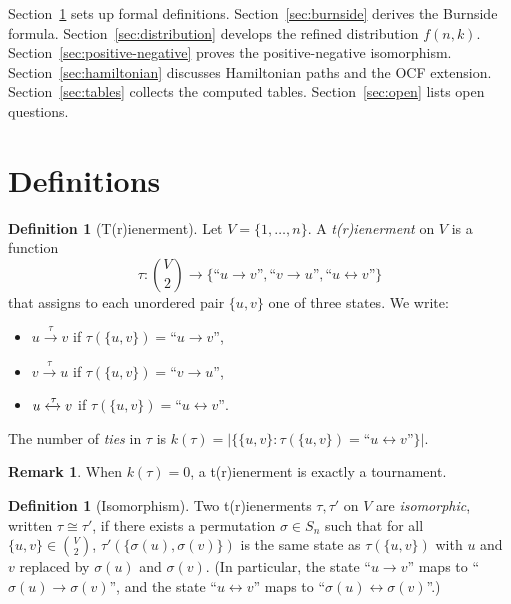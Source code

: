 \documentclass[12pt,reqno]{amsart}
\theoremstyle{definition}
\newtheorem{definition}[theorem]{Definition}
\newtheorem{remark}[theorem]{Remark}
\theoremstyle{plain}
\begin{document}
Section~\ref{sec:defs} sets up formal definitions.  Section~\ref{sec:burnside}
derives the Burnside formula.  Section~\ref{sec:distribution} develops the
refined distribution $f(n,k)$.  Section~\ref{sec:positive-negative} proves the
positive-negative isomorphism.  Section~\ref{sec:hamiltonian} discusses
Hamiltonian paths and the OCF extension.  Section~\ref{sec:tables} collects
the computed tables.  Section~\ref{sec:open} lists open questions.

\section{Definitions}
\label{sec:defs}

\begin{definition}[T(r)ienerment]\label{def:trienerment}
Let $V=\{1,\ldots,n\}$.  A \emph{t(r)ienerment} on $V$ is a function
\[
  \tau: \binom{V}{2}\to \bigl\{\text{``}u\to v\text{''}, \text{``}v\to u\text{''}, \text{``}u\leftrightarrow v\text{''}\bigr\}
\]
that assigns to each unordered pair $\{u,v\}$ one of three states.  We write:
\begin{itemize}
\item $u\xrightarrow{\tau}v$ if $\tau(\{u,v\})=\text{``}u\to v\text{''}$,
\item $v\xrightarrow{\tau}u$ if $\tau(\{u,v\})=\text{``}v\to u\text{''}$,
\item $u\xleftrightarrow{\tau}v$ if $\tau(\{u,v\})=\text{``}u\leftrightarrow v\text{''}$.
\end{itemize}
The number of \emph{ties} in $\tau$ is
$k(\tau)=\bigl|\bigl\{\{u,v\}:\tau(\{u,v\})=\text{``}u\leftrightarrow v\text{''}\bigr\}\bigr|$.
\end{definition}

\begin{remark}
When $k(\tau)=0$, a t(r)ienerment is exactly a tournament.
\end{remark}

\begin{definition}[Isomorphism]\label{def:iso}
Two t(r)ienerments $\tau,\tau'$ on $V$ are \emph{isomorphic}, written $\tau\cong\tau'$,
if there exists a permutation $\sigma\in S_n$ such that for all $\{u,v\}\in\binom{V}{2}$,
$\tau'(\{\sigma(u),\sigma(v)\})$ is the same state as $\tau(\{u,v\})$ with $u$ and $v$
replaced by $\sigma(u)$ and $\sigma(v)$.  (In particular, the state ``$u\to v$'' maps to
``$\sigma(u)\to\sigma(v)$'', and the state ``$u\leftrightarrow v$'' maps to
``$\sigma(u)\leftrightarrow\sigma(v)$''.)
\end{definition}
\end{document}
